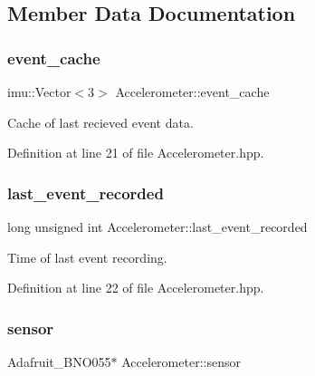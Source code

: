 \subsection{Member Data Documentation}
\mbox{\label{class_accelerometer_a179b04d61746127f9264ce87ba6e20ce}} 
\subsubsection{\texorpdfstring{event\+\_\+cache}{event\_cache}}
{\footnotesize\ttfamily imu\+::\+Vector$<$3$>$ Accelerometer\+::event\+\_\+cache\hspace{0.3cm}{\ttfamily [private]}}



Cache of last recieved event data. 



Definition at line 21 of file Accelerometer.\+hpp.

\mbox{\label{class_accelerometer_a9cf8cf4caf6e866bc2b3e473155f6731}} 
\subsubsection{\texorpdfstring{last\+\_\+event\+\_\+recorded}{last\_event\_recorded}}
{\footnotesize\ttfamily long unsigned int Accelerometer\+::last\+\_\+event\+\_\+recorded\hspace{0.3cm}{\ttfamily [private]}}



Time of last event recording. 



Definition at line 22 of file Accelerometer.\+hpp.

\mbox{\label{class_accelerometer_a0dbf3aed48d0d0d9a16511c628ed2cba}} 
\subsubsection{\texorpdfstring{sensor}{sensor}}
{\footnotesize\ttfamily Adafruit\+\_\+\+B\+N\+O055$\ast$ Accelerometer\+::sensor\hspace{0.3cm}{\ttfamily [private]}}



